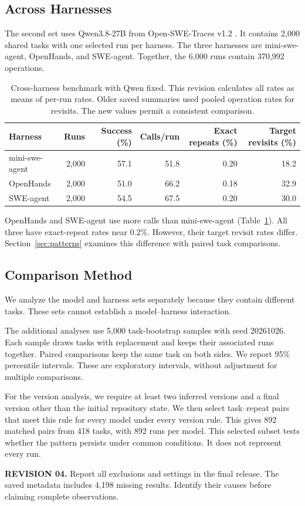 \documentclass[10pt,a4paper,twocolumn]{article}
\newcommand{\rev}[2]{\par\smallskip\noindent\begin{minipage}{\linewidth}\color{revision}\footnotesize\textbf{REVISION #1.} #2\end{minipage}\par\smallskip}
\begin{document}
\subsection{Across Harnesses}
The second set uses Qwen3.8-27B from Open-SWE-Traces v1.2 \citep{openswe}. It contains 2,000 shared tasks with one selected run per harness. The three harnesses are mini-swe-agent, OpenHands, and SWE-agent. Together, the 6,000 runs contain 370,992 operations.
\begin{table}[t]
\centering\small\setlength{\tabcolsep}{8pt}
\begin{tabular}{lrrrrr}
\toprule
Harness & Runs & Success (\%) & Calls/run & Exact repeats (\%) & Target revisits (\%)\\
\midrule
mini-swe-agent & 2,000 & 57.1 & 51.8 & 0.20 & 18.2\\
OpenHands & 2,000 & 51.0 & 66.2 & 0.18 & 32.9\\
SWE-agent & 2,000 & 54.5 & 67.5 & 0.20 & 30.0\\
\bottomrule
\end{tabular}
\caption{Cross-harness benchmark with Qwen fixed. This revision calculates all rates as means of per-run rates. Older saved summaries used pooled operation rates for revisits. The new values permit a consistent comparison.}
\label{tab:harness}
\end{table}
OpenHands and SWE-agent use more calls than mini-swe-agent (Table~\ref{tab:harness}). All three have exact-repeat rates near 0.2\%. However, their target revisit rates differ. Section~\ref{sec:patterns} examines this difference with paired task comparisons.

\subsection{Comparison Method}
We analyze the model and harness sets separately because they contain different tasks. These sets cannot establish a model--harness interaction.

The additional analyses use 5,000 task-bootstrap samples with seed 20261026. Each sample draws tasks with replacement and keeps their associated runs together. Paired comparisons keep the same task on both sides. We report 95\% percentile intervals. These are exploratory intervals, without adjustment for multiple comparisons.

For the version analysis, we require at least two inferred versions and a final version other than the initial repository state. We then select task--repeat pairs that meet this rule for every model under every version rule. This gives 892 matched pairs from 418 tasks, with 892 runs per model. This selected subset tests whether the pattern persists under common conditions. It does not represent every run.
\rev{04}{Report all exclusions and settings in the final release. The saved metadata includes 4,198 missing results. Identify their causes before claiming complete observations.}
\end{document}
